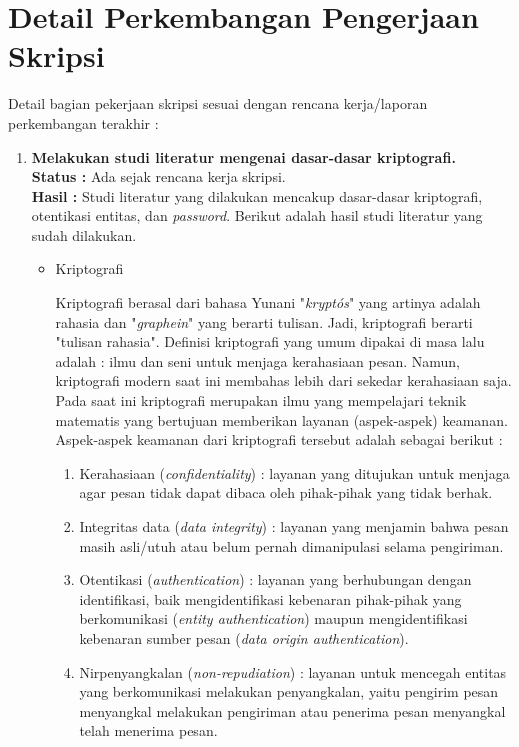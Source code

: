 \documentclass[a4paper,twoside]{article}
\begin{document}
\section{Detail Perkembangan Pengerjaan Skripsi}
Detail bagian pekerjaan skripsi sesuai dengan rencana kerja/laporan perkembangan terakhir :
	\begin{enumerate}
	
		\item \textbf{Melakukan studi literatur mengenai dasar-dasar kriptografi.}\\
		{\bf Status :} Ada sejak rencana kerja skripsi.\\
		{\bf Hasil :} Studi literatur yang dilakukan mencakup dasar-dasar kriptografi, otentikasi entitas, dan \textit{password}. Berikut adalah hasil studi literatur yang sudah dilakukan. 

\begin{itemize}
\item Kriptografi 

Kriptografi berasal dari bahasa Yunani "\textit{krypt\'{o}s}" yang artinya adalah rahasia dan "\textit{graphein}" yang berarti tulisan. Jadi, kriptografi berarti "tulisan rahasia". Definisi kriptografi yang umum dipakai di masa lalu adalah : ilmu dan seni untuk menjaga kerahasiaan pesan. Namun, kriptografi modern saat ini membahas lebih dari sekedar kerahasiaan saja. Pada saat ini kriptografi merupakan ilmu yang mempelajari teknik matematis yang bertujuan memberikan layanan (aspek-aspek) keamanan. Aspek-aspek keamanan dari kriptografi tersebut adalah sebagai berikut :
\begin{enumerate}
	\item Kerahasiaan (\textit{confidentiality}) : layanan yang ditujukan untuk menjaga agar pesan tidak dapat dibaca oleh pihak-pihak yang tidak berhak.
	\item Integritas data (\textit{data integrity}) : layanan yang menjamin bahwa pesan masih asli/utuh atau belum pernah dimanipulasi selama pengiriman.
	\item Otentikasi (\textit{authentication}) : layanan yang berhubungan dengan identifikasi, baik mengidentifikasi kebenaran pihak-pihak yang berkomunikasi (\textit{entity authentication}) maupun mengidentifikasi kebenaran sumber pesan (\textit{data origin authentication}).
	\item Nirpenyangkalan (\textit{non-repudiation}) : layanan untuk mencegah entitas yang berkomunikasi melakukan penyangkalan, yaitu pengirim pesan menyangkal melakukan pengiriman atau penerima pesan menyangkal telah menerima pesan. \\
\end{enumerate} 


\end{itemize}
\end{enumerate}
\end{document}
